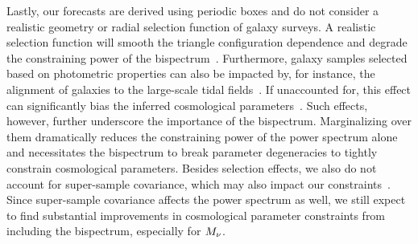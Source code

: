 Lastly, our forecasts are derived using periodic boxes and do not consider a
realistic geometry or radial selection function of galaxy surveys. A realistic 
selection function will smooth the triangle configuration dependence and degrade 
the constraining power of the bispectrum~\citep{sefusatti2005}. Furthermore, galaxy 
samples selected based on photometric properties can also be impacted by, for instance, 
the alignment of galaxies to the large-scale tidal fields~\citep{hirata2009,
krause2011, martens2018, obuljen2019}. If unaccounted for, this effect can
significantly bias the inferred cosmological parameters~\citep{agarwal2020}. 
Such effects, however, further underscore the importance of the bispectrum.
Marginalizing over them dramatically reduces the constraining power of the
power spectrum alone and necessitates the bispectrum to break parameter
degeneracies to tightly constrain cosmological parameters. Besides selection
effects, we also do not account for super-sample covariance, which may also impact 
our constraints~\citep{hamilton2006, sefusatti2006, takada2013, li2018,
wadekar2019}. Since super-sample covariance affects the power spectrum as well, 
we still expect to find substantial improvements in cosmological parameter 
constraints from including the bispectrum, especially for $M_\nu$. 


